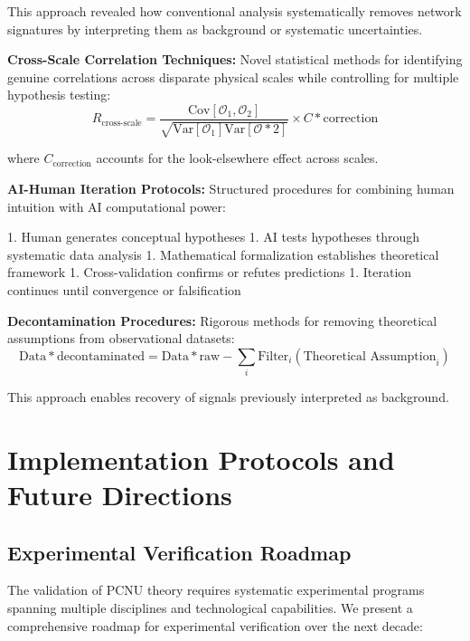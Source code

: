 \documentclass[11pt,a4paper]{article}
\begin{document}
This approach revealed how conventional analysis systematically removes network signatures by interpreting them as background or systematic uncertainties.

\textbf{Cross-Scale Correlation Techniques:}
Novel statistical methods for identifying genuine correlations across disparate physical scales while controlling for multiple hypothesis testing:
\begin{equation}
R_{\text{cross-scale}} = \frac{\text{Cov}[\mathcal{O}_1, \mathcal{O}_2]}{\sqrt{\text{Var}[\mathcal{O}_1] \text{Var}[\mathcal{O}*2]}} \times C*{\text{correction}}
\label{eq:cross_scale_correlation}
\end{equation}

where $C_{\text{correction}}$ accounts for the look-elsewhere effect across scales.

\textbf{AI-Human Iteration Protocols:}
Structured procedures for combining human intuition with AI computational power:

1. Human generates conceptual hypotheses
1. AI tests hypotheses through systematic data analysis
1. Mathematical formalization establishes theoretical framework
1. Cross-validation confirms or refutes predictions
1. Iteration continues until convergence or falsification

\textbf{Decontamination Procedures:}
Rigorous methods for removing theoretical assumptions from observational datasets:
\begin{equation}
\text{Data}*{\text{decontaminated}} = \text{Data}*{\text{raw}} - \sum_i \text{Filter}_i(\text{Theoretical Assumption}_i)
\label{eq:decontamination_procedure}
\end{equation}

This approach enables recovery of signals previously interpreted as background.

\section{Implementation Protocols and Future Directions}

\subsection{Experimental Verification Roadmap}

The validation of PCNU theory requires systematic experimental programs spanning multiple disciplines and technological capabilities. We present a comprehensive roadmap for experimental verification over the next decade:
\end{document}
